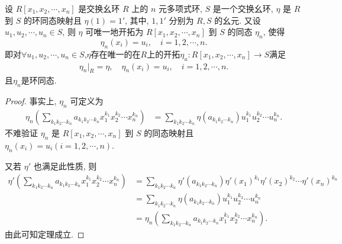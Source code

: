 \documentclass[../../main.tex]{subfiles}%
\begin{document}
\begin{theorem}\label{theorem:n元多项式环开拓定理}
设 \( R[x_1, x_2, \cdots, x_n] \) 是交换幺环 \( R \) 上的 \( n \) 元多项式环, \( S \) 是一个交换幺环, \( \eta \) 是 \( R \) 到 \( S \) 的环同态映射且 \( \eta(1) = 1' \), 其中, \( 1, 1' \) 分别为 \( R, S \) 的幺元. 又设 \( u_1, u_2, \cdots, u_n \in S \), 则 \( \eta \) 可唯一地开拓为 \( R[x_1, x_2, \cdots, x_n] \) 到 \( S \) 的同态 \( \eta_n \), 使得
\[
\eta_n(x_i) = u_i, \quad i = 1, 2, \cdots, n.
\]
即对$\forall u_1, u_2, \cdots, u_n \in S$,$\eta$存在唯一的在$R$上的开拓$\eta_u:R[x_1,x_2,\cdots,x_n]\to S$满足
\begin{align*}
\eta_n|_{R}=\eta,\quad \eta_n(x_i) = u_i, \quad i = 1, 2, \cdots, n.
\end{align*}
且$\eta_n$是环同态.
\end{theorem}

\begin{proof}

事实上, \( \eta_n \) 可定义为
\begin{align*}
\eta_n \left( \sum_{k_1 k_2 \cdots k_n} a_{k_1 k_2 \cdots k_n} x_1^{k_1} x_2^{k_2} \cdots x_n^{k_n} \right) &= \sum_{k_1 k_2 \cdots k_n} \eta(a_{k_1 k_2 \cdots k_n}) u_1^{k_1} u_2^{k_2} \cdots u_n^{k_n}.
\end{align*}
不难验证 \( \eta_n \) 是 \( R[x_1, x_2, \cdots, x_n] \) 到 \( S \) 的同态映射且 \( \eta_n(x_i) = u_i (i = 1, 2, \cdots, n) \).

又若 \( \eta' \) 也满足此性质, 则
\begin{align*}
\eta' \left( \sum_{k_1 k_2 \cdots k_n} a_{k_1 k_2 \cdots k_n} x_1^{k_1} x_2^{k_2} \cdots x_n^{k_n} \right) &= \sum_{k_1 k_2 \cdots k_n} \eta'(a_{k_1 k_2 \cdots k_n}) \eta'(x_1)^{k_1} \eta'(x_2)^{k_2} \cdots \eta'(x_n)^{k_n} \\
&= \sum_{k_1 k_2 \cdots k_n} \eta(a_{k_1 k_2 \cdots k_n}) u_1^{k_1} u_2^{k_2} \cdots u_n^{k_n} \\
&= \eta_n \left( \sum_{k_1 k_2 \cdots k_n} a_{k_1 k_2 \cdots k_n} x_1^{k_1} x_2^{k_2} \cdots x_n^{k_n} \right).
\end{align*}
由此可知定理成立.

\end{proof}
\end{document}
